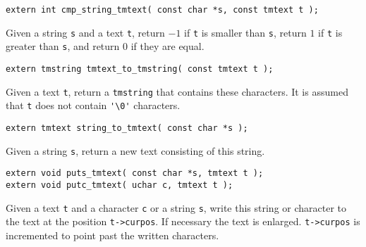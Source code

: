 \begin{verbatim}
extern int cmp_string_tmtext( const char *s, const tmtext t );
\end{verbatim}
\begin{desc}
Given a string \verb's' and a text \verb't', return $-1$ if \verb't' is
smaller than \verb's', return $1$ if \verb't' is greater than \verb's', and
return $0$ if they are equal. 
\end{desc}
\begin{verbatim}
extern tmstring tmtext_to_tmstring( const tmtext t );
\end{verbatim}
\begin{desc}
Given a text \verb't', return a \verb'tmstring' that contains these characters.
It is assumed that \verb't' does not contain \verb"'\0'" characters.
\end{desc}
\begin{verbatim}
extern tmtext string_to_tmtext( const char *s );
\end{verbatim}
\begin{desc}
Given a string \verb's', return a new text consisting of this string.
\end{desc}
\begin{verbatim}
extern void puts_tmtext( const char *s, tmtext t );
extern void putc_tmtext( uchar c, tmtext t );
\end{verbatim}
\begin{desc}
Given a text \verb't' and a character \verb'c' or a string \verb's', write
this string or character to the text at the position \verb't->curpos'.
If necessary the text is enlarged. \verb't->curpos' is incremented
to point past the written characters.
\end{desc}
